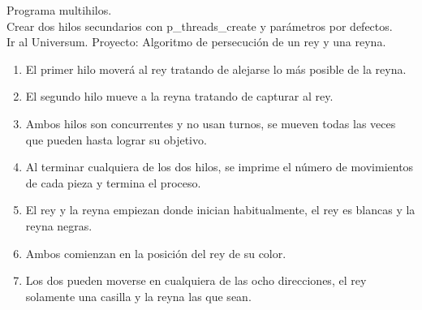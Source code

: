 Programa multihilos.\\
Crear dos hilos secundarios con p_threads_create y par\'{a}metros por defectos.\\
Ir al Universum.
Proyecto: Algoritmo de persecuci\'{o}n de un rey y una reyna.\\
\begin{enumerate}
	\item El primer hilo mover\'{a} al rey tratando de alejarse lo m\'{a}s posible de la reyna.
	\item El segundo hilo mueve a la reyna tratando de capturar al rey.
	\item Ambos hilos son concurrentes y no usan turnos, se mueven todas las veces que pueden hasta lograr su objetivo.
	\item Al terminar cualquiera de los dos hilos, se imprime el n\'{u}mero de movimientos de cada pieza y termina el proceso.
	\item El rey y la reyna empiezan donde inician habitualmente, el rey es blancas y la reyna negras.
	\item Ambos comienzan en la posici\'{o}n del rey de su color.
	\item Los dos pueden moverse en cualquiera de las ocho direcciones, el rey solamente una casilla y la reyna las que sean.
\end{enumerate}

